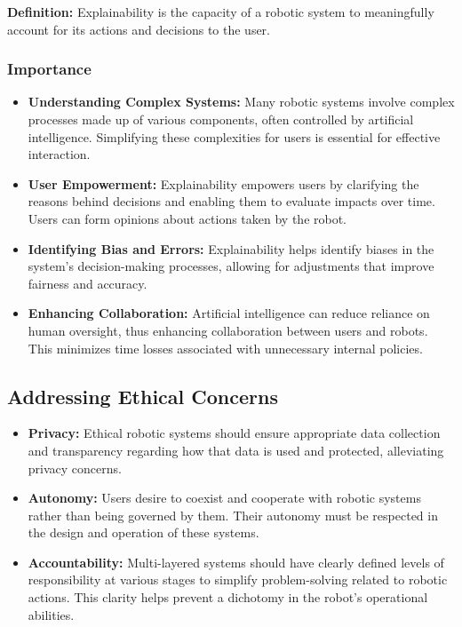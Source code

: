 \textbf{Definition:} Explainability is the capacity of a robotic system to meaningfully account for its actions and decisions to the user.

\subsubsection{Importance}
\begin{itemize}
    \item \textbf{Understanding Complex Systems:} Many robotic systems involve complex processes made up of various components, often controlled by artificial intelligence. Simplifying these complexities for users is essential for effective interaction.
    
    \item \textbf{User Empowerment:} Explainability empowers users by clarifying the reasons behind decisions and enabling them to evaluate impacts over time. Users can form opinions about actions taken by the robot.
    
    \item \textbf{Identifying Bias and Errors:} Explainability helps identify biases in the system's decision-making processes, allowing for adjustments that improve fairness and accuracy.
    
    \item \textbf{Enhancing Collaboration:} Artificial intelligence can reduce reliance on human oversight, thus enhancing collaboration between users and robots. This minimizes time losses associated with unnecessary internal policies.
\end{itemize}

\subsection{Addressing Ethical Concerns}

\begin{itemize}
    \item \textbf{Privacy:} Ethical robotic systems should ensure appropriate data collection and transparency regarding how that data is used and protected, alleviating privacy concerns.
    
    \item \textbf{Autonomy:} Users desire to coexist and cooperate with robotic systems rather than being governed by them. Their autonomy must be respected in the design and operation of these systems.
    
    \item \textbf{Accountability:} Multi-layered systems should have clearly defined levels of responsibility at various stages to simplify problem-solving related to robotic actions. This clarity helps prevent a dichotomy in the robot's operational abilities.
\end{itemize}

